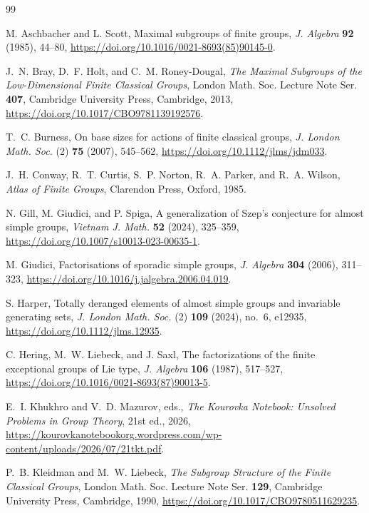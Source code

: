 \documentclass[11pt]{amsart}
\theoremstyle{definition}
\begin{document}
\begin{thebibliography}{99}
\footnotesize

M. Aschbacher and L. Scott,
Maximal subgroups of finite groups,
\emph{J. Algebra} \textbf{92} (1985), 44--80,
\url{https://doi.org/10.1016/0021-8693(85)90145-0}.

J.~N. Bray, D.~F. Holt, and C.~M. Roney-Dougal,
\emph{The Maximal Subgroups of the Low-Dimensional Finite Classical Groups},
London Math. Soc. Lecture Note Ser. \textbf{407},
Cambridge University Press, Cambridge, 2013,
\url{https://doi.org/10.1017/CBO9781139192576}.

T.~C. Burness,
On base sizes for actions of finite classical groups,
\emph{J. London Math. Soc.} (2) \textbf{75} (2007), 545--562,
\url{https://doi.org/10.1112/jlms/jdm033}.

J.~H. Conway, R.~T. Curtis, S.~P. Norton, R.~A. Parker, and R.~A. Wilson,
\emph{Atlas of Finite Groups}, Clarendon Press, Oxford, 1985.

N. Gill, M. Giudici, and P. Spiga,
A generalization of Szep's conjecture for almost simple groups,
\emph{Vietnam J. Math.} \textbf{52} (2024), 325--359,
\url{https://doi.org/10.1007/s10013-023-00635-1}.

M. Giudici,
Factorisations of sporadic simple groups,
\emph{J. Algebra} \textbf{304} (2006), 311--323,
\url{https://doi.org/10.1016/j.jalgebra.2006.04.019}.

S. Harper,
Totally deranged elements of almost simple groups and invariable generating
sets,
\emph{J. London Math. Soc.} (2) \textbf{109} (2024), no.~6, e12935,
\url{https://doi.org/10.1112/jlms.12935}.

C. Hering, M.~W. Liebeck, and J. Saxl,
The factorizations of the finite exceptional groups of Lie type,
\emph{J. Algebra} \textbf{106} (1987), 517--527,
\url{https://doi.org/10.1016/0021-8693(87)90013-5}.

E.~I. Khukhro and V.~D. Mazurov, eds.,
\emph{The Kourovka Notebook: Unsolved Problems in Group Theory},
21st ed., 2026,
\url{https://kourovkanotebookorg.wordpress.com/wp-content/uploads/2026/07/21tkt.pdf}.

P.~B. Kleidman and M.~W. Liebeck,
\emph{The Subgroup Structure of the Finite Classical Groups},
London Math. Soc. Lecture Note Ser. \textbf{129},
Cambridge University Press, Cambridge, 1990,
\url{https://doi.org/10.1017/CBO9780511629235}.


\end{thebibliography}
\end{document}
